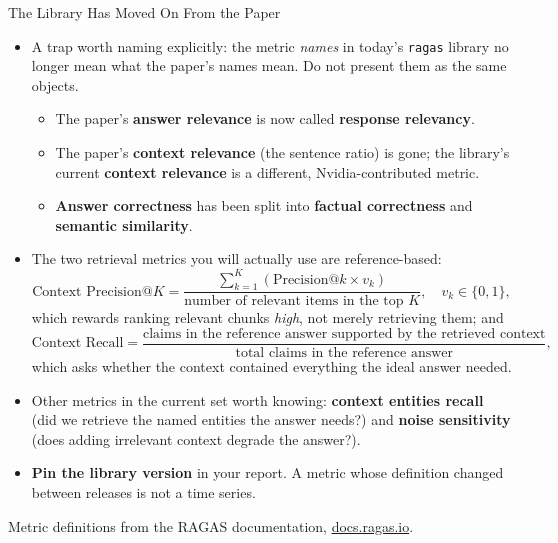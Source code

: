 \begin{frame}[allowframebreaks]{The Library Has Moved On From the Paper}
  \begin{itemize}\footnotesize\itemsep0.3em
    \item[\textcolor{red}{$\blacktriangleright$}] A trap worth naming explicitly: the metric \textit{names} in today's \texttt{ragas} library no longer mean what the paper's names mean. Do not present them as the same objects.
      \begin{itemize}\itemsep0.15em
        \item The paper's \textbf{answer relevance} is now called \textbf{response relevancy}.
        \item The paper's \textbf{context relevance} (the sentence ratio) is gone; the library's current \textbf{context relevance} is a different, Nvidia-contributed metric.
        \item \textbf{Answer correctness} has been split into \textbf{factual correctness} and \textbf{semantic similarity}.
      \end{itemize}
    \item[\textcolor{red}{$\blacktriangleright$}] The two retrieval metrics you will actually use are reference-based:
      \[ \text{Context Precision@}K = \frac{\sum_{k=1}^{K} \left(\text{Precision@}k \times v_k\right)}{\text{number of relevant items in the top } K}, \quad v_k \in \{0,1\}, \]
      which rewards ranking relevant chunks \textit{high}, not merely retrieving them; and
      \[ \text{Context Recall} = \frac{\text{claims in the reference answer supported by the retrieved context}}{\text{total claims in the reference answer}}, \]
      which asks whether the context contained everything the ideal answer needed.
    \item[\textcolor{red}{$\blacktriangleright$}] Other metrics in the current set worth knowing: \textbf{context entities recall} (did we retrieve the named entities the answer needs?) and \textbf{noise sensitivity} (does adding irrelevant context degrade the answer?).
    \item[\textcolor{red}{$\blacktriangleright$}] \textbf{Pin the library version} in your report. A metric whose definition changed between releases is not a time series.
  \end{itemize}
  \vspace{0.1em}
  {\scriptsize Metric definitions from the RAGAS documentation, \href{https://docs.ragas.io/en/stable/concepts/metrics/available_metrics/}{docs.ragas.io}.}
\end{frame}

